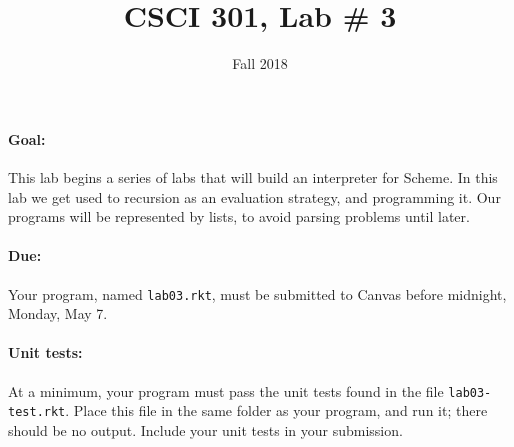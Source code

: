 \documentclass{article}
\title{CSCI 301, Lab \# 3}
\author{Fall 2018}
\date{}
\begin{document}
\maketitle


\paragraph{Goal:} This lab begins a series of labs that will
build an interpreter for Scheme.  In this lab we get used to
recursion as an evaluation strategy, and programming it.
Our programs will be represented by lists, to avoid parsing problems
until later.

\paragraph{Due:} Your program, named {\tt lab03.rkt}, must be submitted to
Canvas before midnight, Monday, May 7.

\paragraph{Unit tests:}
At a minimum, your program must pass the unit tests found in the
file {\tt lab03-test.rkt}.  Place this file in the same folder
as your program, and run it;  there should be no output.  Include
your unit tests in your submission.
\end{document}
